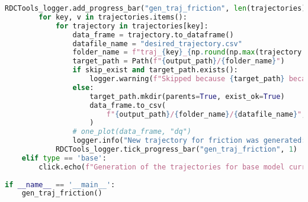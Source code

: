 \begin{lstlisting}[language=python, caption=\raggedright{generation/gen\_trajectory\_friction.py}, frame=single]
        RDCTools_logger.add_progress_bar("gen_traj_friction", len(trajectories), "Generate trajectories for each joint", "joint")
        for key, v in trajectories.items():
            for trajectory in trajectories[key]:
                data_frame = trajectory.to_dataframe()
                datafile_name = "desired_trajectory.csv"
                folder_name = f"traj_{key}_{np.round(np.max(trajectory.dq[:, key].raw), 2)}_{np.round(np.max(trajectory.ddq[:, key].raw), 2)}"
                target_path = Path(f"{output_path}/{folder_name}")
                if skip_exist and target_path.exists():
                    logger.warning(f"Skipped because {target_path} because path already exists")
                else:
                    target_path.mkdir(parents=True, exist_ok=True)
                    data_frame.to_csv(
                        f"{output_path}/{folder_name}/{datafile_name}", index=False
                    )
                # one_plot(data_frame, "dq")
                logger.info("New trajectory for friction was generated: %s", target_path)
            RDCTools_logger.tick_progress_bar("gen_traj_friction", 1)
    elif type == 'base':
        click.echo(f"Generation of the trajectories for base model currently is not implemented")
    
if __name__ == '__main__':
    gen_traj_friction()

\end{lstlisting}